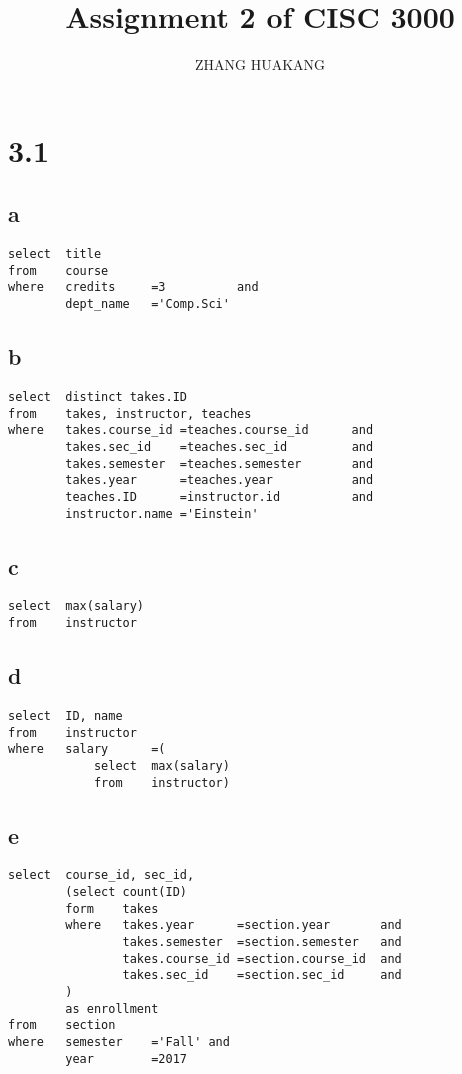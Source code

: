 \documentclass{article}
\title{Assignment 2 of CISC 3000}
\author{ZHANG HUAKANG}
\begin{document}
    \maketitle
    \section*{3.1}
    \subsection*{a}
    \begin{verbatim}
select  title 
from    course 
where   credits     =3          and 
        dept_name   ='Comp.Sci'
    \end{verbatim}
    \subsection*{b}
    \begin{verbatim}
select  distinct takes.ID 
from    takes, instructor, teaches
where   takes.course_id =teaches.course_id      and
        takes.sec_id    =teaches.sec_id         and
        takes.semester  =teaches.semester       and
        takes.year      =teaches.year           and
        teaches.ID      =instructor.id          and
        instructor.name ='Einstein'
    \end{verbatim}
    \subsection*{c}
    \begin{verbatim}
select  max(salary) 
from    instructor
    \end{verbatim}
    \subsection*{d}
    \begin{verbatim}
select  ID, name 
from    instructor 
where   salary      =(
            select  max(salary) 
            from    instructor)
    \end{verbatim}
    \subsection*{e}
    \begin{verbatim}
select  course_id, sec_id, 
        (select count(ID)
        form    takes
        where   takes.year      =section.year       and
                takes.semester  =section.semester   and
                takes.course_id =section.course_id  and
                takes.sec_id    =section.sec_id     and
        )
        as enrollment 
from    section
where   semester    ='Fall' and
        year        =2017
    \end{verbatim}
\end{document}

